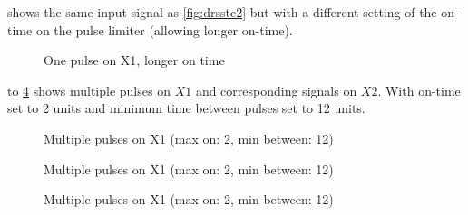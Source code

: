  shows the same input signal as \cref{fig:drsstc2} but with a different setting of the on-time on the pulse limiter (allowing longer on-time).

\begin{figure}[!ht]
    \centering
    \caption{One pulse on X1, longer on time}
    \label{fig:drsstc3}
\end{figure}{}


 to \cref{fig:drsstc6} shows multiple pulses on $X1$ and corresponding signals on $X2$. With on-time set to 2 units and minimum time between pulses set to 12 units.

\begin{figure}[!ht]
    \centering
    \caption{Multiple pulses on X1 (max on: 2, min between: 12)}
    \label{fig:drsstc4}
\end{figure}{}

\begin{figure}[!ht]
    \centering
    \caption{Multiple pulses on X1 (max on: 2, min between: 12)}
    \label{fig:drsstc5}
\end{figure}{}

\begin{figure}[!ht]
    \centering
    \caption{Multiple pulses on X1 (max on: 2, min between: 12)}
    \label{fig:drsstc6}
\end{figure}{}

